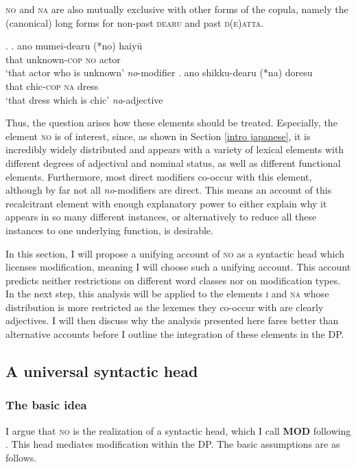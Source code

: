 \textsc{no} and \textsc{na} are also mutually exclusive with other forms of the copula, namely the (canonical) long forms for non-past \textsc{dearu} and past \textsc{d(e)atta}.

\ex. \label{dearuno} \ag. ano mumei-dearu (*no) haiyū\\
that unknown-\textsc{cop} \textsc{no} actor\\
`that actor who is unknown' \null \hfill \textit{no}-modifier
\bg. ano shikku-dearu (*na) doresu\\
that chic-\textsc{cop} \textsc{na} dress\\
`that dress which is chic’ \null \hfill \textit{na}-adjective

Thus, the question arises how these elements should be treated. Especially, the element \textsc{no} is of interest, since, as shown in Section \ref{intro japanese}, it is incredibly widely distributed and appears with a variety of lexical elements with different degrees of adjectival and nominal status, as well as different functional elements. Furthermore, most direct modifiers co-occur with this element, although by far not all \textit{no}-modifiers are direct. This means an account of this recalcitrant element with enough explanatory power to either explain why it appears in so many different instances, or alternatively to reduce all these instances to one underlying function, is desirable.

In this section, I will propose a unifying account of \textsc{no} as a syntactic head which licenses modification, meaning I will choose such a unifying account. This account predicts neither restrictions on different word classes nor on modification types. In the next step, this analysis will be applied to the elements \textsc{i} and \textsc{na} whose distribution is more restricted as the lexemes they co-occur with are clearly adjectives. I will then discuss why the analysis presented here fares better than alternative accounts before I outline the integration of these elements in the DP.

\subsection{A universal syntactic head}

\subsubsection{The basic idea}

I argue that \textsc{no} is the realization of a syntactic head, which I call \textbf{MOD} following \citet{rubin:1993:category, rubin:1994:mod, rubin:1996:transparent}. This head mediates modification within the DP. The basic assumptions are as follows.

